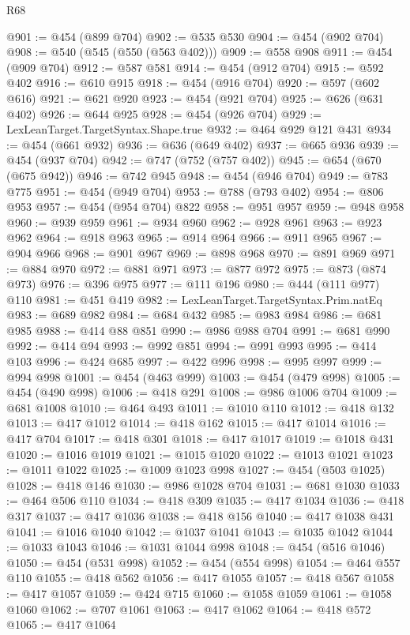 \begin{lexlean}{R68}
\begin{coremodule}
@901 := @454 (@899 @704)
@902 := @535 @530
@904 := @454 (@902 @704)
@908 := @540 (@545 (@550 (@563 @402)))
@909 := @558 @908
@911 := @454 (@909 @704)
@912 := @587 @581
@914 := @454 (@912 @704)
@915 := @592 @402
@916 := @610 @915
@918 := @454 (@916 @704)
@920 := @597 (@602 @616)
@921 := @621 @920
@923 := @454 (@921 @704)
@925 := @626 (@631 @402)
@926 := @644 @925
@928 := @454 (@926 @704)
@929 := LexLeanTarget.TargetSyntax.Shape.true
@932 := @464 @929 @121 @431
@934 := @454 (@661 @932)
@936 := @636 (@649 @402)
@937 := @665 @936
@939 := @454 (@937 @704)
@942 := @747 (@752 (@757 @402))
@945 := @654 (@670 (@675 @942))
@946 := @742 @945
@948 := @454 (@946 @704)
@949 := @783 @775
@951 := @454 (@949 @704)
@953 := @788 (@793 @402)
@954 := @806 @953
@957 := @454 (@954 @704) @822
@958 := @951 @957
@959 := @948 @958
@960 := @939 @959
@961 := @934 @960
@962 := @928 @961
@963 := @923 @962
@964 := @918 @963
@965 := @914 @964
@966 := @911 @965
@967 := @904 @966
@968 := @901 @967
@969 := @898 @968
@970 := @891 @969
@971 := @884 @970
@972 := @881 @971
@973 := @877 @972
@975 := @873 (@874 @973)
@976 := @396 @975
@977 := @111 @196
@980 := @444 (@111 @977) @110
@981 := @451 @419
@982 := LexLeanTarget.TargetSyntax.Prim.natEq
@983 := @689 @982
@984 := @684 @432
@985 := @983 @984
@986 := @681 @985
@988 := @414 @88 @851
@990 := @986 @988 @704
@991 := @681 @990
@992 := @414 @94
@993 := @992 @851
@994 := @991 @993
@995 := @414 @103
@996 := @424 @685
@997 := @422 @996
@998 := @995 @997
@999 := @994 @998
@1001 := @454 (@463 @999)
@1003 := @454 (@479 @998)
@1005 := @454 (@490 @998)
@1006 := @418 @291
@1008 := @986 @1006 @704
@1009 := @681 @1008
@1010 := @464 @493
@1011 := @1010 @110
@1012 := @418 @132
@1013 := @417 @1012
@1014 := @418 @162
@1015 := @417 @1014
@1016 := @417 @704
@1017 := @418 @301
@1018 := @417 @1017
@1019 := @1018 @431
@1020 := @1016 @1019
@1021 := @1015 @1020
@1022 := @1013 @1021
@1023 := @1011 @1022
@1025 := @1009 @1023 @998
@1027 := @454 (@503 @1025)
@1028 := @418 @146
@1030 := @986 @1028 @704
@1031 := @681 @1030
@1033 := @464 @506 @110
@1034 := @418 @309
@1035 := @417 @1034
@1036 := @418 @317
@1037 := @417 @1036
@1038 := @418 @156
@1040 := @417 @1038 @431
@1041 := @1016 @1040
@1042 := @1037 @1041
@1043 := @1035 @1042
@1044 := @1033 @1043
@1046 := @1031 @1044 @998
@1048 := @454 (@516 @1046)
@1050 := @454 (@531 @998)
@1052 := @454 (@554 @998)
@1054 := @464 @557 @110
@1055 := @418 @562
@1056 := @417 @1055
@1057 := @418 @567
@1058 := @417 @1057
@1059 := @424 @715
@1060 := @1058 @1059
@1061 := @1058 @1060
@1062 := @707 @1061
@1063 := @417 @1062
@1064 := @418 @572
@1065 := @417 @1064

\end{coremodule}
\end{lexlean}
